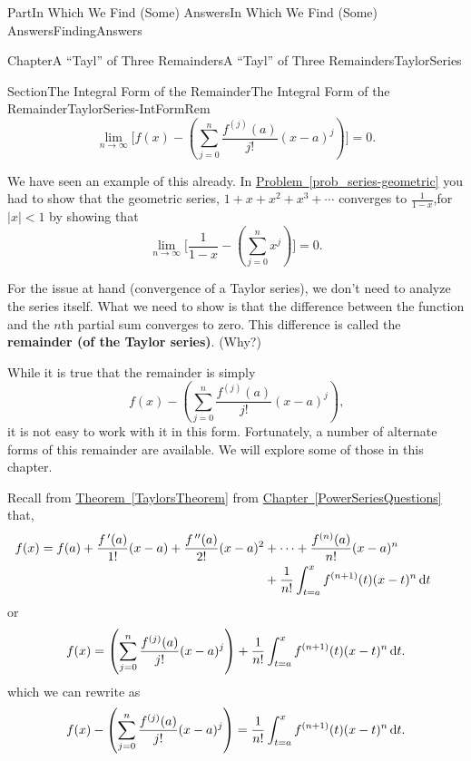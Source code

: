 \documentclass[oneside,10pt,]{book}
\newcommand{\xreffont}{\relax}
\newcommand{\terminology}[1]{\textbf{#1}}
\numberwithin{equation}{part}
\newcommand{\dx}[1]{\,{\rm d}#1}
\def\limit#1#2#3{{\displaystyle\lim_{#1\rightarrow #2}#3}}
\newcommand{\lt}{<}
\newcommand{\amp}{&}
\begin{document}
\begin{partptx}{Part}{In Which We Find (Some) Answers}{}{In Which We Find (Some) Answers}{}{}{FindingAnswers}
\begin{chapterptx}{Chapter}{A ``Tayl'' of Three Remainders}{}{A ``Tayl'' of Three Remainders}{}{}{TaylorSeries}
\begin{sectionptx}{Section}{The Integral Form of the Remainder}{}{The Integral Form of the Remainder}{}{}{TaylorSeries-IntFormRem}
\begin{equation*}
\limit{n}{\infty}{\Biggl[f(x)-\left(\sum_{j=0}^n \frac{f^{(j)}(a)}{j!}(x-a)^j\right)\Biggr]}=0\text{.}
\end{equation*}
%
\par
We have seen an example of this already. In \hyperref[prob_series-geometric]{Problem~{\xreffont\ref{prob_series-geometric}}} you had to show that the geometric series, \(1+x+x^2+x^3+\cdots\) converges to \(\frac{1}{1-x}\),for \(|x|\lt 1\) by showing that%
\begin{equation*}
\limit{n}{\infty}{\Biggl[\frac{1}{1-x}-\left(\sum_{j=0}^nx^j\right)\Biggr]=0}\text{.}
\end{equation*}
%
\par
For the issue at hand (convergence of a Taylor series), we don't need to analyze the series itself.  What we need to show is that the difference between the function and the \(n\)th partial sum converges to zero.  This difference is called the \terminology{remainder (of the Taylor series)}. (Why?)%
\par
While it is true that the remainder is simply%
\begin{equation*}
f(x)-\left(\sum_{j=0}^n\frac{f^{(j)}(a)}{j!}(x-a)^j\right)\text{,}
\end{equation*}
it is not easy to work with it in this form. Fortunately, a number of alternate forms of this remainder are available.  We will explore some of those in this chapter.%
\par
{} Recall  from \hyperref[TaylorsTheorem]{Theorem~{\xreffont\ref{TaylorsTheorem}}} from \hyperref[PowerSeriesQuestions]{Chapter~{\xreffont\ref{PowerSeriesQuestions}}} that,%
\begin{align*}
f(x)=f(a)+\frac{f^{\,\prime}(a)}{1!}(x-a)+\frac{f^{\,\prime\prime}(a)}{2!}(x-a)^2\amp{} +\cdots+\frac{f^{(n)}(a)}{n!}(x-a)^n\\
\amp{} +\frac{1}{n!}\int_{t=a}^xf^{(n+1)}(t)(x-t)^n\dx{t}\amp{}\amp{}
\end{align*}
or%
\begin{equation}
f(x)=\left(\sum_{j=0}^n\frac{f^{(j)}(a)}{j!}(x-a)^j\right)+\frac{1}{n!}\int_{t=a}^xf^{(n+1)}(t)(x-t)^n\dx{t}\text{.}\label{EQUATIONIntFormRem1}
\end{equation}
which we can        rewrite as%
\begin{equation*}
f(x)-\left(\sum_{j=0}^n\frac{f^{(j)}(a)}{j!}(x-a)^j\right)=\frac{1}{n!}\int_{t=a}^xf^{(n+1)}(t)(x-t)^n\dx{ t}\text{.}
\end{equation*}

\end{sectionptx}
\end{chapterptx}
\end{partptx}
\end{document}
